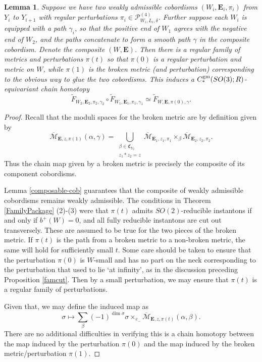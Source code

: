 \documentclass[10pt,a4paper]{amsart}
\newtheorem{lemma}[theorem]{Lemma}
\theoremstyle{definition}
\theoremstyle{remark}
\numberwithin{figure}{qchap}
\begin{document}
\begin{lemma}\label{composition}Suppose we have two weakly admissible cobordisms $(W_i, \mathbf{E}_i, \pi_i)$ from $Y_i$ to $Y_{i+1}$ with regular perturbations $\pi_i \in \mathcal P^{(4)}_{W_i, L_i, \delta}$. Further suppose each $W_i$ is equipped with a path $\gamma_i$, so that the positive end of $W_1$ agrees with the negative end of $W_2$, and the paths concatenate to form a smooth path $\gamma$ in the composite cobordism. Denote the composite $(W, \mathbf{E})$. Then there is a regular family of metrics and perturbations $\pi(t)$ so that $\pi(0)$ is a regular perturbation and metric on $W$, while $\pi(1)$ is the broken metric (and perturbation) corresponding to the obvious way to glue the two cobordisms. This induces a $C_*^{\textup{gm}}(SO(3);R)$-equivariant chain homotopy $$\widetilde F_{W_2, \mathbf{E}_2, \pi_2, \gamma_2} \circ \widetilde F_{W_1, \mathbf{E}_1, \pi_1, \gamma_1} \simeq \widetilde F_{W, \mathbf{E}, \pi(0), \gamma}.$$
\end{lemma}
\begin{proof}Recall that the moduli spaces for the broken metric are by definition given by $$\overline{\mathcal M}_{\mathbf{E},z,\pi(1)}(\alpha, \gamma) = \bigcup_{\substack{\beta \in \mathfrak C_{Y_2}\\ z_1 * z_2 = z}} \overline{\mathcal M}_{\mathbf{E}_1,z_1,\pi_1} \times_{\beta} \overline{\mathcal M}_{\mathbf{E}_2, z_2, \pi_2}.$$ Thus the chain map given by a broken metric is precisely the composite of its component cobordisms.

Lemma \ref{composable-cob} guarantees that the composite of weakly admissible cobordisms remains weakly admissible. The conditions in Theorem \ref{FamilyPackage} (2)-(3) were that $\pi(t)$ admits $SO(2)$-reducible instantons if and only if $b^+(W) = 0$, and all fully reducible instantons are cut out transversely. These are assumed to be true for the two pieces of the broken metric. If $\pi(t)$ is the path from a broken metric to a non-broken metric, the same will hold for sufficiently small $t$. Some care should be taken to ensure that the perturbation $\pi(0)$ is $W$-small and has no part on the neck corresponding to the perturbation that used to lie `at infinity', as in the discussion preceding Proposition \ref{famcut}. Then by a small perturbation, we may ensure that $\pi(t)$ is a regular family of perturbations.

Given that, we may define the induced map as 
$$\sigma \mapsto \sum_\beta (-1)^{\dim \sigma} \sigma \times_{e_-}\overline{\mathcal M}_{\mathbf{E},z,\pi(t)}(\alpha, \beta).$$ 
There are no additional difficulties in verifying this is a chain homotopy between the map induced by the perturbation $\pi(0)$ and the map induced by the broken metric/perturbation $\pi(1)$.
\end{proof}
\end{document}
